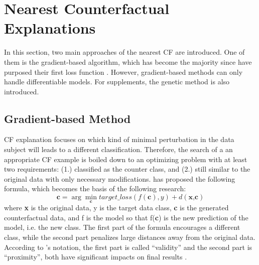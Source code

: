 \section{Nearest Counterfactual Explanations}\label{sec:generation}
In this section, two main approaches of the nearest CF are introduced. One of them is the gradient-based algorithm, which has become the majority since \citeauthor{watcher2017} \cite{watcher2017} have purposed their first loss function \cite{CFReview}. However, gradient-based methods can only handle differentiable models. For supplements, the genetic method is also introduced.

\subsection{Gradient-based Method}\label{sec:lossFunc}
CF explanation focuses on which kind of minimal perturbation in the data subject will leads to a different classification. Therefore, the search of a an appropriate CF example is boiled down to an optimizing problem with at least two requirements: (1.) classified as the counter class, and (2.) still similar to the original data with only necessary modifications. \citeauthor{watcher2017} \cite{watcher2017} has proposed the following formula, which becomes the basis of the following research:
\begin{equation}\label{eq:watcher}
  \textbf{c}=\arg\min_{\textbf{c}}target\_loss(f(\textbf{c}),y)+d(\textbf{x,c})
\end{equation}
where \textbf{x} is the original data, y is the target data class, \textbf{c} is the generated counterfactual data, and f is the model so that f(\textbf{c}) is the new prediction of the model, i.e. the new class. The first part of the formula encourages a different class, while the second part penalizes large distances away from the original data. According to \citeauthor{watcher2017}'s notation, the first part is called ``validity'' and the second part is ``proximity'', both have significant impacts on final results \cite{watcher2017}.

